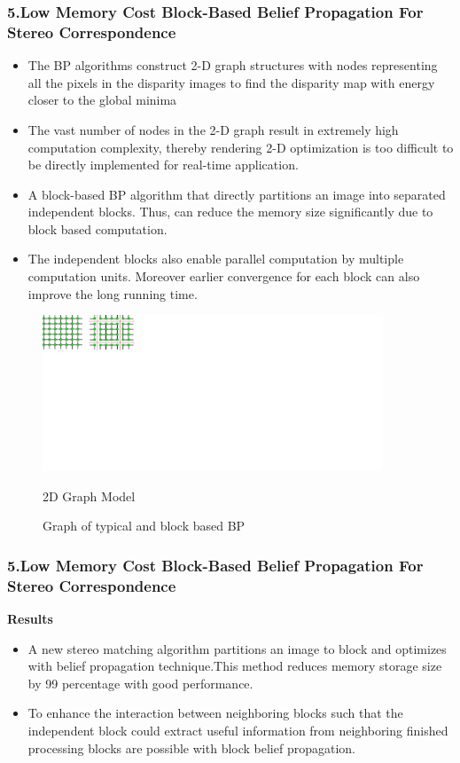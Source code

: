 \documentclass{beamer}
\begin{document}
\begin{frame}
\frametitle{\textbf{5.Low Memory Cost Block-Based Belief Propagation For Stereo Correspondence}}
\begin{itemize}
\item The BP algorithms construct 2-D graph structures with nodes representing all the pixels in the disparity images to find the disparity map with energy closer to the global minima
\item The vast number of nodes in the 2-D graph  result in  extremely high computation complexity, thereby rendering 2-D optimization is too difficult to be directly implemented for real-time application.
\item A block-based BP algorithm that directly partitions an image into separated independent blocks. Thus, can reduce the memory size significantly due to block based computation.
 \item The independent blocks also enable parallel computation by multiple computation units. Moreover earlier convergence for each block can also improve the long running time.
\end{itemize}
\end{frame}
\begin{frame}
\begin{figure}
 \includegraphics[width=4in]{block2.pdf}\\
  \caption{Graph of typical and block based BP}\label{}
2D Graph Model
\end{figure}
\end{frame}


\begin{frame}
\frametitle{\textbf{5.Low Memory Cost Block-Based Belief Propagation For Stereo Correspondence}}
\textbf{Results}
\begin{itemize}
\item A new stereo matching algorithm partitions an image to block and optimizes with belief propagation technique.This method reduces memory storage size by 99 percentage
with good performance.
\item To enhance the interaction  between neighboring blocks such that the independent block could extract useful information from  neighboring finished processing blocks are possible with block belief propagation.
\end{itemize}
\end{frame}
\end{document}
